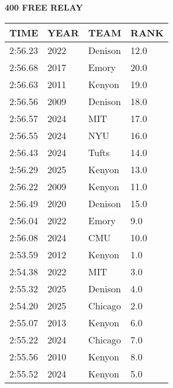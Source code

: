 \begin{center}
\begin{minipage}[t]{0.7\textwidth}
\centering
\textbf{400 FREE RELAY}\\[0.05cm]
\begin{tabular}{@{}p{1.8cm}p{1.2cm}p{1.4cm}p{0.8cm}@{}}
\hline
\textbf{TIME} & \textbf{YEAR} & \textbf{TEAM} & \textbf{RANK} \\
\hline
2:56.23 & 2022 & Denison & 12.0 \\
2:56.68 & 2017 & Emory & 20.0 \\
2:56.63 & 2011 & Kenyon & 19.0 \\
2:56.56 & 2009 & Denison & 18.0 \\
2:56.57 & 2024 & MIT & 17.0 \\
2:56.55 & 2024 & NYU & 16.0 \\
2:56.43 & 2024 & Tufts & 14.0 \\
2:56.29 & 2025 & Kenyon & 13.0 \\
2:56.22 & 2009 & Kenyon & 11.0 \\
2:56.49 & 2020 & Denison & 15.0 \\
2:56.04 & 2022 & Emory & 9.0 \\
2:56.08 & 2024 & CMU & 10.0 \\
2:53.59 & 2012 & Kenyon & 1.0 \\
2:54.38 & 2022 & MIT & 3.0 \\
2:55.32 & 2025 & Denison & 4.0 \\
2:54.20 & 2025 & Chicago & 2.0 \\
2:55.07 & 2013 & Kenyon & 6.0 \\
2:55.22 & 2024 & Chicago & 7.0 \\
2:55.56 & 2010 & Kenyon & 8.0 \\
2:55.52 & 2024 & Kenyon & 5.0 \\
\hline
\end{tabular}
\end{minipage}
\end{center}

\vspace{0.4cm}

